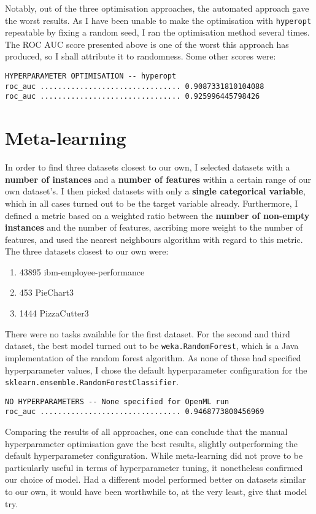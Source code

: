 \documentclass[10pt, a4paper]{article}
\begin{document}
Notably, out of the three optimisation approaches, the automated approach gave the worst results. As I have been unable to make the
optimisation with \verb|hyperopt| repeatable by fixing a random seed, I ran the optimisation method several times. The ROC AUC
score presented above is one of the worst this approach has produced, so I shall attribute it to randomness. Some other scores were:
\begin{verbatim}
HYPERPARAMETER OPTIMISATION -- hyperopt
roc_auc ................................ 0.9087331810104088
roc_auc ................................ 0.925996445798426
\end{verbatim}

\section{Meta-learning}

In order to find three datasets closest to our own, I selected datasets with a \textbf{number of instances} and a \textbf{number of features} 
within a certain range of our own dataset's. I then picked datasets with only a \textbf{single categorical variable}, which in all cases
turned out to be the target variable already. Furthermore, I defined a metric based on a weighted ratio between the
\textbf{number of non-empty instances} and the number of features, ascribing more weight to the number of features, and used the nearest
neighbours algorithm with regard to this metric. The three datasets closest to our own were:

\begin{enumerate}
\item 43895 ibm-employee-performance
\item 453 PieChart3
\item 1444 PizzaCutter3
\end{enumerate}

There were no tasks available for the first dataset. For the second and third dataset, the best model turned out to be
\verb|weka.RandomForest|, which is a Java implementation of the random forest algorithm. As none of these had specified
hyperparameter values, I chose the default \-hyperpara\-meter configuration for the \verb|sklearn.ensemble.RandomForestClassifier|.

\begin{verbatim}
NO HYPERPARAMETERS -- None specified for OpenML run
roc_auc ................................ 0.9468773800456969
\end{verbatim}

Comparing the results of all approaches, one can conclude that the \-manual hyperparameter optimisation gave the best results,
slightly outperforming the default hyperparameter configuration. While meta-learning did not prove to be particularly useful in
terms of hyperparameter tuning, it nonetheless confirmed our choice of model. Had a different model performed better on datasets
similar to our own, it would have been worthwhile to, at the very least, give that model try.
\end{document}
